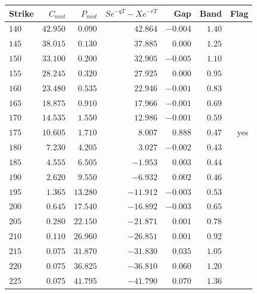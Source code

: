 \begin{tabular}{lrrrrrr}
\toprule
Strike & $C_{mid}$ & $P_{mid}$ & $Se^{-qT}-Xe^{-rT}$ & Gap & Band & Flag \\
\midrule
$140$ & $42.950$ & $0.090$ & $42.864$ & $-0.004$ & $1.40$ &  \\
$145$ & $38.015$ & $0.130$ & $37.885$ & $0.000$ & $1.25$ &  \\
$150$ & $33.100$ & $0.200$ & $32.905$ & $-0.005$ & $1.10$ &  \\
$155$ & $28.245$ & $0.320$ & $27.925$ & $0.000$ & $0.95$ &  \\
$160$ & $23.480$ & $0.535$ & $22.946$ & $-0.001$ & $0.83$ &  \\
$165$ & $18.875$ & $0.910$ & $17.966$ & $-0.001$ & $0.69$ &  \\
$170$ & $14.535$ & $1.550$ & $12.986$ & $-0.001$ & $0.59$ &  \\
$175$ & $10.605$ & $1.710$ & $8.007$ & $0.888$ & $0.47$ & yes \\
$180$ & $7.230$ & $4.205$ & $3.027$ & $-0.002$ & $0.43$ &  \\
$185$ & $4.555$ & $6.505$ & $-1.953$ & $0.003$ & $0.44$ &  \\
$190$ & $2.620$ & $9.550$ & $-6.932$ & $0.002$ & $0.46$ &  \\
$195$ & $1.365$ & $13.280$ & $-11.912$ & $-0.003$ & $0.53$ &  \\
$200$ & $0.645$ & $17.540$ & $-16.892$ & $-0.003$ & $0.65$ &  \\
$205$ & $0.280$ & $22.150$ & $-21.871$ & $0.001$ & $0.78$ &  \\
$210$ & $0.110$ & $26.960$ & $-26.851$ & $0.001$ & $0.92$ &  \\
$215$ & $0.075$ & $31.870$ & $-31.830$ & $0.035$ & $1.05$ &  \\
$220$ & $0.075$ & $36.825$ & $-36.810$ & $0.060$ & $1.20$ &  \\
$225$ & $0.075$ & $41.795$ & $-41.790$ & $0.070$ & $1.36$ &  \\
\bottomrule
\end{tabular}
